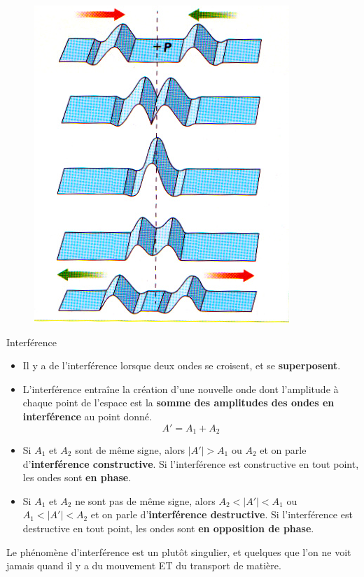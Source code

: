\documentclass[11pt,a4paper]{article}
\begin{document}
\begin{figure}
  \centering\includegraphics[width=\linewidth]{imgs/p5/interfere.jpg}
\end{figure}

\begin{defn}{Interférence}
\begin{itemize}
    \item Il y a de l’interférence lorsque deux ondes se croisent, et se \textbf{superposent}.
    \item L’interférence entraîne la création d’une nouvelle onde dont l’amplitude à chaque point de l’espace est la \textbf{somme des amplitudes des ondes en interférence} au point donné. 
        \[ A'= A_1 + A_2 \]
    \item Si $A_1$  et $A_2$  sont de même signe, alors $|A'| > A_1  \text{ ou } A_2$  et on parle d’\textbf{interférence constructive}. Si l’interférence est constructive en tout point, les ondes sont \textbf{en phase}. 
    \item Si $A_1$  et $A_2$  ne sont pas de même signe, alors $A_2<|A'|<A_1$   ou $A_1<|A'|<A_2$ et on parle d’\textbf{interférence destructive}. Si l’interférence est destructive en tout point, les ondes sont \textbf{en opposition de phase}. 
\end{itemize}
\end{defn}
Le phénomène d'interférence est un plutôt singulier, et quelques que l'on ne voit jamais quand il y a du mouvement ET du transport de matière. 
\end{document}

